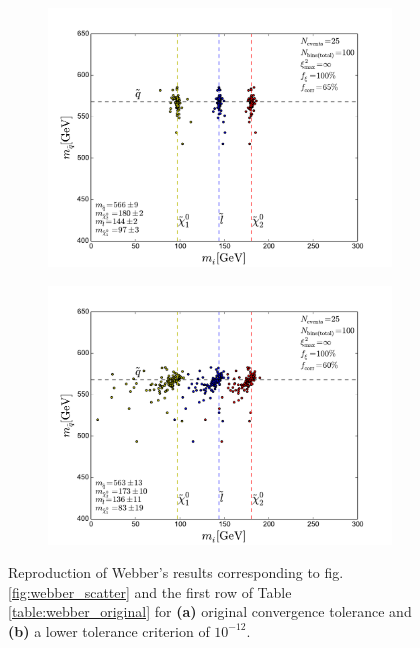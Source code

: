 \documentclass[twoside,english]{uiofysmaster}
\begin{document}
\begin{figure}[hbt]
	\centering
	\begin{subfigure}[b]{0.8\textwidth}
		\includegraphics[width=\textwidth]{figures/webber_rec_table/webber_rec_table-samesettings_0psmear-nocut.pdf} 
		\caption{ }
		\label{fig:webber_rec_scatter_tolerance-comparison_a}
	\end{subfigure}

	\begin{subfigure}[b]{0.8\textwidth}
		\includegraphics[width=\textwidth]{figures/webber_rec_table/webber_HW-rec_nocut.pdf}
		\caption{ } 
		\label{fig:webber_rec_scatter_tolerance-comparison_b}
	\end{subfigure}
	\caption{Reproduction of Webber's results corresponding to fig. \ref{fig:webber_scatter} and the first row of Table \ref{table:webber_original} for {\bf (a)} original convergence tolerance and {\bf (b)} a lower tolerance criterion of $10^{-12}$.}
	\label{fig:webber_rec_scatter_tolerance-comparison}
\end{figure}
\end{document}
